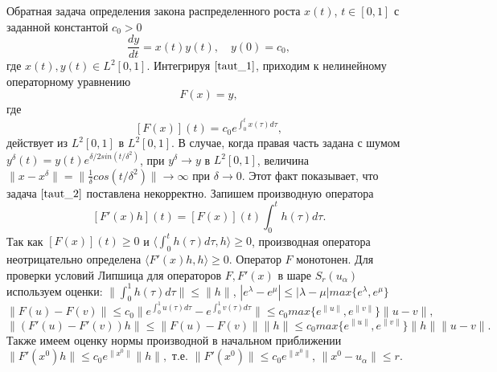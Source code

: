 Обратная задача определения закона распределенного роста $x(t)$, $t\in[0, 1]$ с заданной константой $c_0>0$
\begin{equation}\label{taut_1}
\frac{dy}{dt}=x(t)y(t), \quad y(0)=c_0,
\end{equation}
где $x(t), y(t)\in L^2[0,1]$. Интегрируя $\eqref{taut_1}$, приходим к нелинейному операторному уравнению
\begin{equation}\label{taut_2}
F(x)=y,
\end{equation}
где $$[F(x)](t)=c_0 e^{\int_{0}^{t}x(\tau)d\tau},$$
действует из $L^2[0,1]$ в $L^2[0,1]$. В случае, когда правая часть задана с шумом $y^\delta(t)=y(t)e^{\delta/2 sin(t/{\delta}^2)}$, при $y^\delta\to y$ в $L^2[0,1]$, величина $\|x-x^\delta\|=\|\frac{1}{\delta}cos(t/{\delta}^2)\|\to\infty$ при $\delta\to 0$. Этот факт показывает, что задача $\eqref{taut_2}$ поставлена некорректно. Запишем производную оператора
\begin{equation}\label{taut_3}
[F'(x)h](t)=[F(x)](t)\int_{0}^{t}h(\tau)d\tau.
\end{equation}
Так как $[F(x)](t)\ge 0$ и $\langle\int_{0}^{t}h(\tau)d\tau, h\rangle\ge 0$, производная оператора неотрицательно определена $\langle F'(x)h, h\rangle\ge 0$. Оператор $F$ монотонен. Для проверки условий Липшица для операторов $F, F'(x)$ в шаре $S_r(u_\alpha)$ используем оценки: $\|\int_{0}^{1}h(\tau)d\tau\|\le\|h\|$, $|e^\lambda-e^\mu|\le|\lambda-\mu|max\{e^\lambda, e^\mu\}$
$$\|F(u)-F(v)\|\le c_0\|e^{\int_{0}^{1}u(\tau)d\tau}-e^{\int_{0}^{1}v(\tau)d\tau}\|
\le c_0 max\{e^{\|u\|},e^{\|v\|}\}\|u-v\|,$$
$$\|(F'(u)-F'(v))h\|\le\|F(u)-F(v)\|\|h\|\le c_0 max\{e^{\|u\|},e^{\|v\|}\}\|h\|\|u-v\|.$$
Также имеем оценку нормы производной в начальном приближении $\|F'(x^0)h\|\le c_0 e^{\|x^0\|}\|h\|,$ т.е. $\|F'(x^0)\|\le c_0 e^{\|x^0\|}$, $\|x^0-u_\alpha\|\le r$.

